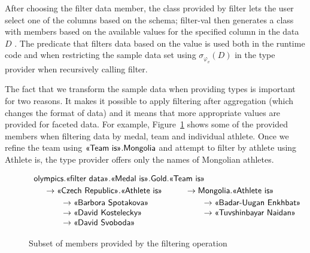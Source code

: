 \documentclass[a4paper,UKenglish]{lipics-v2016}
\theoremstyle{plain}
\theoremstyle{definition}
\newcommand{\ball}[1]{\FPeval{\result}{clip(201+#1)}\textnormal{\ding{\result}}}
\newcommand{\ident}[1]{\textnormal{\sffamily #1}}
\newcommand{\qident}[1]{\textnormal{\sffamily \guillemotleft #1\guillemotright}}
\begin{document}
After choosing the \qident{filter data} member, the class provided by \ident{filter} lets the 
user select one of the columns \ball{4} based on the schema; \ident{filter-val} then 
generates a class with members based on the available values for the specified column in the data 
$D$ \ball{5}. The predicate that filters data based on the value \ball{6} is used both in the 
runtime code and when restricting the sample data set using $\sigma_{\varphi_v}(D)$ 
in the type provider when recursively calling \ident{filter}.

The fact that we transform the sample data when providing types is important for two reasons.
It makes it possible to apply filtering after aggregation (which changes the format of data)
and it means that more appropriate values are provided for faceted data. For example,
Figure~\ref{fig:pivot-filter} shows some of the provided members when filtering data by medal,
team and individual athlete. Once we refine the team using $\qident{Team is}.\ident{Mongolia}$
and attempt to filter by athlete using \qident{Athlete is}, the type provider offers only the
names of Mongolian athletes.

 
\begin{figure}
\begin{equation*}
\begin{array}{l}
\ident{olympics}.\qident{filter data}.\qident{Medal is}.\ident{Gold}.\qident{Team is}\\[0.25em]
\quad\begin{array}{l}
\rightarrow \qident{Czech Republic}.\qident{Athlete is}\\[0.25em]
\qquad \rightarrow \qident{Barbora Spotakova}\\
\qquad \rightarrow \qident{David Kostelecky}\\
\qquad \rightarrow \qident{David Svoboda}\\
\end{array}\qquad
\begin{array}{l}
\rightarrow \ident{Mongolia}.\qident{Athlete is}\\[0.25em]
\qquad \rightarrow \qident{Badar-Uugan Enkhbat}\\
\qquad \rightarrow \qident{Tuvshinbayar Naidan}\\
\\
\end{array}
\end{array}
\end{equation*}
\caption{Subset of members provided by the filtering operation}
\label{fig:pivot-filter}
\end{figure}
\end{document}

